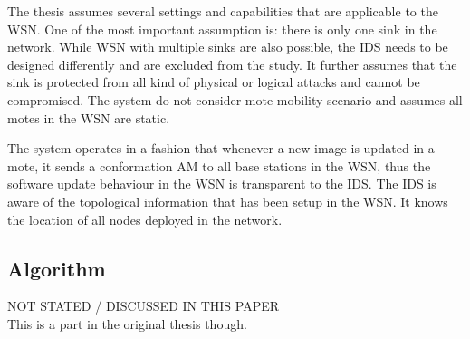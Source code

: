 \documentclass[conference,final]{IEEEtran}
\begin{document}
The thesis assumes several settings and capabilities that are applicable to the WSN.
One of the most important assumption is: there is only one sink in the network. While WSN with multiple sinks are also possible, the IDS needs to be designed differently and are excluded from the study. 
It further assumes that the sink is protected from all kind of physical or logical attacks and cannot be compromised. 
The system do not consider mote mobility scenario and assumes all motes in the WSN are static.

The system operates in a fashion that whenever a new image is updated in a mote, it sends a conformation AM to all base stations in the WSN, thus the software update behaviour in the WSN is transparent to the IDS.
The IDS is aware of the topological information that has been setup in the WSN.
It knows the location of all nodes deployed in the network.


\subsection{Algorithm}
\label{subsec:alg}
NOT STATED / DISCUSSED IN THIS PAPER\\
This is a part in the original thesis though.
\end{document}
